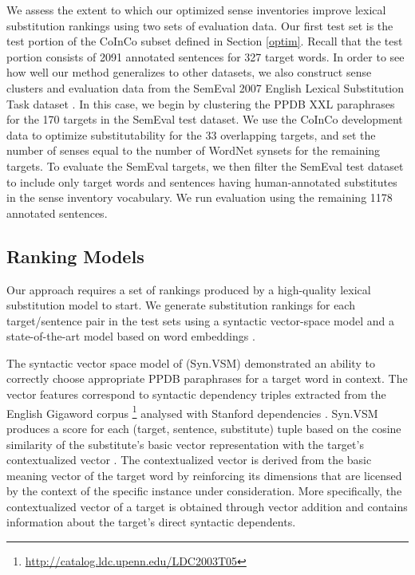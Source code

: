 \documentclass[11pt]{article}
\begin{document}
We assess the extent to which our optimized sense inventories improve lexical substitution rankings using two sets of evaluation data. Our first test set is the test portion of the CoInCo subset defined in Section \ref{optim}. Recall that the test portion consists of 2091 annotated sentences for 327 target words. In order to see how well our method generalizes to other datasets, we also construct sense clusters and evaluation data from the SemEval 2007 English Lexical Substitution Task dataset \cite{mccarthy-navigli:07}. In this case, we begin by clustering the PPDB XXL paraphrases for the 170 targets in the SemEval test dataset. We use the CoInCo development data to optimize substitutability for the 33 overlapping targets, and set the number of senses equal to the number of WordNet synsets for the remaining targets. To evaluate the SemEval targets, we then filter the SemEval test dataset to include only target words and sentences having human-annotated substitutes in the sense inventory vocabulary. We run evaluation using the remaining 1178 annotated sentences. 

\subsection{Ranking Models}

Our approach requires a set of rankings produced by a high-quality lexical substitution model to start. We generate substitution rankings for each target/sentence pair in the test sets using a syntactic vector-space model \cite{thater-furstenau-pinkal:2011:IJCNLP-2011,apidianaki:2016:EMNLP2016} and a state-of-the-art model based on word embeddings \cite{melamud-levy-dagan:2015:VSM-NLP}. 

The syntactic vector space model of  (Syn.VSM) demonstrated an ability to correctly choose appropriate PPDB paraphrases for a target word in context. The vector features correspond to syntactic dependency triples extracted from the English Gigaword corpus \footnote{\url{http://catalog.ldc.upenn.edu/LDC2003T05}} analysed with Stanford dependencies \cite{mcdm:06}. Syn.VSM produces a score for each (target, sentence, substitute) tuple based on the cosine similarity of the substitute's basic vector representation with the target's contextualized vector \cite{thater-furstenau-pinkal:2011:IJCNLP-2011}. The contextualized vector is derived from the basic meaning vector of the target word by reinforcing its dimensions that are licensed by the context of the specific instance under consideration. More specifically, the contextualized vector of a target is obtained through vector addition and contains information about the target's direct syntactic dependents. 
\end{document}
